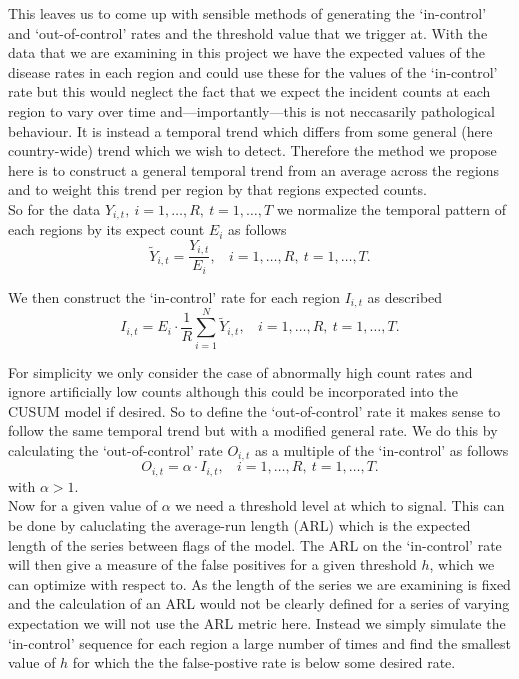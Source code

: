 \documentclass[11pt]{report}
\begin{document}
This leaves us to come up with sensible methods of generating the `in-control' and `out-of-control' rates and the threshold value that we trigger at. With the data that we are examining in this project we have the expected values of the disease rates in each region and could use these for the values of the `in-control' rate but this would neglect the fact that we expect the incident counts at each region to vary over time and---importantly---this is not neccasarily pathological behaviour. It is instead a temporal trend which differs from some general (here country-wide) trend which we wish to detect. Therefore the method we propose here is to construct a general temporal trend from an average across the regions and to weight this trend per region by that regions expected counts. \\

So for the data $Y_{i,t}, \ i = 1, \ldots, R, \ t = 1, \ldots, T$ we normalize the temporal pattern of each regions by its expect count $E_{i}$ as follows
\begin{equation}
\tilde{Y}_{i, t} = \frac{Y_{i, t}}{E_{i}}, \ \ \ \ i = 1, \ldots, R, \ t = 1, \ldots, T.
\end{equation} 

We then construct the `in-control' rate for each region $I_{i, t}$ as described
\begin{equation}
I_{i, t} = E_i \cdot \frac{1}{R} \sum_{i=1}^N \tilde{Y}_{i, t}, \ \ \ \ i = 1, \ldots, R, \ t = 1, \ldots, T.
\end{equation}

For simplicity we only consider the case of abnormally high count rates and ignore artificially low counts although this could be incorporated into the CUSUM model if desired. So to define the `out-of-control' rate it makes sense to follow the same temporal trend but with a modified general rate. We do this by calculating the `out-of-control' rate $O_{i,t}$ as a multiple of the `in-control' as follows
\begin{equation}
O_{i,t} = \alpha \cdot I_{i,t}, \ \ \ \  i = 1, \ldots, R, \ t = 1, \ldots, T.
\end{equation} 
with $\alpha > 1$. \\

Now for a given value of $\alpha$ we need a threshold level at which to signal. This can be done by caluclating the average-run length (ARL) which is the expected length of the series between flags of the model. The ARL on the `in-control' rate will then give a measure of the false positives for a given threshold $h$, which we can optimize with respect to. As the length of the series we are examining is fixed and the calculation of an ARL would not be clearly defined for a series of varying expectation we will not use the ARL metric here. Instead we simply simulate the `in-control' sequence for each region a large number of times and find the smallest value of $h$ for which the the false-postive rate is below some desired rate. \\
\end{document}
